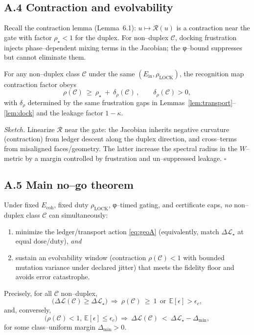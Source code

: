\documentclass[11pt]{article}
\begin{document}
\subsection*{A.4 Contraction and evolvability}
Recall the contraction lemma (Lemma~6.1): $u\mapsto \mathcal{R}(u)$ is a contraction near the gate with factor $\rho_\star<1$ for the duplex. For non–duplex $\mathcal{C}$, docking frustration injects phase–dependent mixing terms in the Jacobian; the φ–bound suppresses but cannot eliminate them.

\begin{lemma}\label{lem:rho}
For any non–duplex class $\mathcal{C}$ under the same $(E_{\mathrm{in}},\rho_{\mathrm{LOCK}})$, the recognition map contraction factor obeys
\[
\rho(\mathcal{C})\ \ge\ \rho_\star\ +\ \delta_\rho(\mathcal{C})\,,\qquad \delta_\rho(\mathcal{C})>0,
\]
with $\delta_\rho$ determined by the same frustration gaps in Lemmas~\ref{lem:transport}–\ref{lem:dock} and the leakage factor $1-\kappa$.
\end{lemma}

\emph{Sketch.} Linearize $\mathcal{R}$ near the gate: the Jacobian inherits negative curvature (contraction) from ledger descent along the duplex direction, and cross–terms from misaligned faces/geometry. The latter increase the spectral radius in the $W$–metric by a margin controlled by frustration and un–suppressed leakage. \hfill$\square$

\subsection*{A.5 Main no–go theorem}
\begin{theorem}\label{thm:nogo}
Under fixed $E_{\mathrm{coh}}$, fixed duty $\rho_{\mathrm{LOCK}}$, φ–timed gating, and certificate caps, \emph{no} non–duplex class $\mathcal{C}$ can simultaneously:
\begin{enumerate}
\item minimize the ledger/transport action \eqref{eq:geoA} (equivalently, match $\Delta\mathcal{L}_\star$ at equal dose/duty), \emph{and}
\item sustain an evolvability window (contraction $\rho(\mathcal{C})<1$ with bounded mutation variance under declared jitter) that meets the fidelity floor and avoids error catastrophe.
\end{enumerate}
Precisely, for all $\mathcal{C}$ non–duplex,
\[
\big(\Delta\mathcal{L}(\mathcal{C})\ge \Delta\mathcal{L}_\star\big)\ \Longrightarrow\ \rho(\mathcal{C})\ \ge\ 1\ \ \text{or}\ \ \mathbb{E}[\epsilon]>\epsilon_c,
\]
and, conversely,
\[
\big(\rho(\mathcal{C})<1,\ \mathbb{E}[\epsilon]\le \epsilon_c\big)\ \Longrightarrow\ \Delta\mathcal{L}(\mathcal{C})\ <\ \Delta\mathcal{L}_\star-\Delta_{\min},
\]
for some class–uniform margin $\Delta_{\min}>0$.
\end{theorem}
\end{document}
